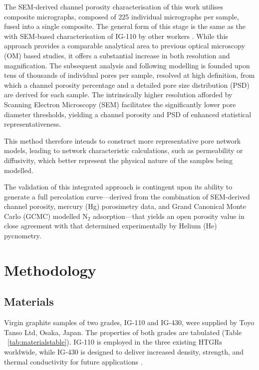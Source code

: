 \documentclass[review]{elsarticle}
\begin{document}
The SEM-derived channel porosity characterisation of this work utilises
composite micrographs, composed of 225 individual micrographs per sample, fused
into a single composite. The general form of this stage is the same as the with
SEM-based characterisation of IG-110  by other workers
\citep{huang2021statistical}. While this approach provides a comparable
analytical area to previous optical microscopy (OM) based studies, it offers a
substantial increase in both resolution and magnification. The subsequent
analysis and following modelling is founded upon tens of thousands of individual
pores per sample, resolved at high definition, from which a channel porosity
percentage and a detailed pore size distribution (PSD) are derived for each
sample. The intrinsically higher resolution afforded by Scanning Electron
Microscopy (SEM) facilitates the significantly lower pore diameter thresholds,
yielding a channel porosity and PSD of enhanced statistical representativeness.

This method therefore intends to construct more representative pore network
models, leading to network characteristic calculations, such as permeability or
diffusivity,  which better represent the physical nature of the samples being
modelled.

The validation of this integrated approach is contingent upon its ability to
generate a full percolation curve—derived from the combination of SEM-derived
channel porosity, mercury (Hg) porosimetry data, and Grand Canonical Monte Carlo
(GCMC) modelled N$_2$ adsorption—that yields an open porosity value in close
agreement with that determined experimentally by Helium (He) pycnometry.


\section{Methodology}

\subsection{Materials}

Virgin graphite samples of two grades, IG-110 and IG-430, were supplied by Toyo
Tanso Ltd\texttrademark{}, Osaka, Japan. The properties of both grades are
tabulated (Table ~\ref{tab:materialstable}). IG‑110 is employed in the
three existing HTGRs worldwide, while IG‑430 is designed to deliver increased
density, strength, and thermal conductivity for future
applications \citep{toyotanso_atomic_nuclear}.
\end{document}
